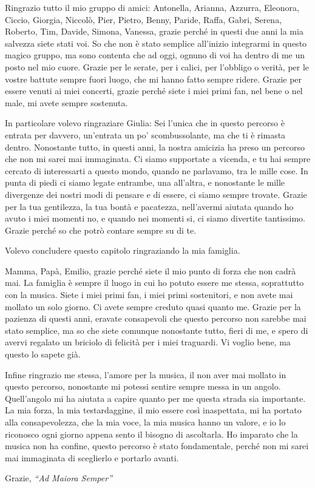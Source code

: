 Ringrazio tutto il mio gruppo di amici: 
Antonella, Arianna, Azzurra, Eleonora, Ciccio, Giorgia, Niccolò, Pier, Pietro, Benny, Paride, Raffa, Gabri, Serena, Roberto, Tim, Davide, Simona, Vanessa, grazie perché in questi due anni la mia salvezza siete stati voi. 
So che non è stato semplice all’inizio integrarmi in questo magico gruppo, ma sono contenta che ad oggi, ognuno di voi ha dentro di me un posto nel mio cuore. 
Grazie per le serate, per i calici, per l’obbligo o verità, per le vostre battute sempre fuori luogo, che mi hanno fatto sempre ridere. Grazie per essere venuti ai miei concerti, grazie perché siete i miei primi fan, nel bene o nel male, mi avete sempre sostenuta. 
\@

In particolare volevo ringraziare
Giulia: Sei l’unica che in questo percorso è entrata per davvero, un’entrata un po' scombussolante, ma che ti è rimasta dentro. 
Nonostante tutto, in questi anni, la nostra amicizia ha preso un percorso che non mi sarei mai immaginata. Ci siamo supportate a vicenda, e tu hai sempre cercato di interessarti a questo mondo, quando ne parlavamo, tra le mille cose. 
In punta di piedi ci siamo legate entrambe, una all’altra, e nonostante le mille divergenze dei nostri modi di pensare e di essere, ci siamo sempre trovate. 
Grazie per la tua gentilezza, la tua bontà e pacatezza, nell’avermi aiutata quando ho avuto i miei momenti no, e quando nei momenti si, ci siamo divertite tantissimo. 
Grazie perché so che potrò contare sempre su di te. 
\@

Volevo concludere questo capitolo ringraziando la mia famiglia. 
\@

Mamma, Papà, Emilio, grazie perché siete il mio punto di forza che non cadrà mai. 
La famiglia è sempre il luogo in cui ho potuto essere me stessa, soprattutto con la musica. 
Siete i miei primi fan, i miei primi sostenitori, e non avete mai mollato un solo giorno. Ci avete sempre creduto quasi quanto me. 
Grazie per la pazienza di questi anni, eravate consapevoli che questo percorso non sarebbe mai stato semplice, ma so che siete comunque nonostante tutto, fieri di me, e spero di avervi regalato un briciolo di felicità per i miei traguardi. 
Vi voglio bene, ma questo lo sapete già. 
\@

Infine ringrazio me stessa, l’amore per la musica, il non aver mai mollato in questo percorso, nonostante mi potessi sentire sempre messa in un angolo. Quell’angolo mi ha aiutata a capire quanto per me questa strada sia importante. 
La mia forza, la mia testardaggine, il mio essere così inaspettata, mi ha portato alla consapevolezza, che la mia voce, la mia musica hanno un valore, e io lo riconosco ogni giorno appena sento il bisogno di ascoltarla. 
Ho imparato che la musica non ha confine, questo percorso è stato fondamentale, perché non mi sarei mai immaginata di sceglierlo e portarlo avanti. 
\@

Grazie, \textit{“Ad Maiora Semper”}
